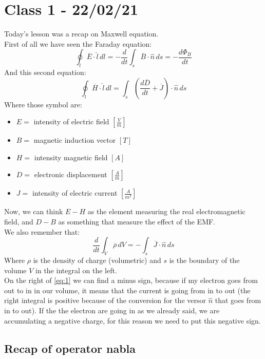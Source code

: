 \section{Class 1 - 22/02/21}
Today's lesson was a recap on Maxwell equation.\\
First of all we have seen the Faraday equation:
\begin{equation}\label{eq:first_maxwell}
 \oint_l \overline{E} \cdot \hat{l} \, dl = -\frac{d}{dt}\int_s \overline{B} \cdot \hat{n} \, ds = - \frac{d\Phi_B}{dt}
\end{equation}
And this second equation:
\begin{equation}
\oint_l \overline{H}\cdot \hat{l} \, dl = \int_s \left(\frac{d\overline{D}}{dt}+\overline{J}\right)\cdot \hat{n}\,ds
\end{equation}
Where those symbol are:
\begin{itemize}
\item $E=$ intensity of electric field $[\frac{V}{m}]$
\item $B=$ magnetic induction vector $[T]$
\item $H=$ intensity magnetic field $[A]$
\item $D=$ electronic displacement $[\frac{A}{m}]$
\item $J=$ intensity of electric current $[\frac{A}{m^2}]$
\end{itemize}
Now, we can think $E - H$ as the element measuring the real electromagnetic field, and $D - B$ as something that measure the effect of the EMF.\\
We also remember that:
\begin{equation}\label{eq:1}
\frac{d}{dt}\int_V \overline{\rho} \, dV=-\int_s \overline{J}\cdot \hat{n}\,ds
\end{equation}
Where $\rho$ is the density of charge (volumetric) and $s$ is the boundary of the volume $V$ in the integral on the left.\\
On the right of \cref{eq:1} we can find a minus sign, because if my electron goes from out to in in our volume, it means that the current is going from in to out (the right integral is positive because of the conversion for the versor $\hat{n}$ that goes from in to out). If the the electron are going in as we already said, we are accumulating a negative charge, for this reason we need to put this negative sign.
\subsection*{Recap of operator nabla}
